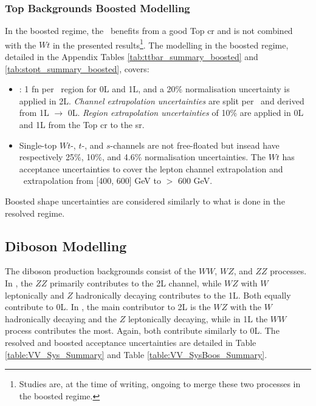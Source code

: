 \subsubsection{Top Backgrounds Boosted Modelling} 
In the boosted regime, the \ttb\ benefits from a good Top \gls{cr} and is not combined with the $Wt$ in the presented results\footnote{Studies are, at the time of writing, ongoing to merge these two processes in the boosted regime.}. The modelling in the boosted regime, detailed in the Appendix Tables \ref{tab:ttbar_summary_boosted} and \ref{tab:stopt_summary_boosted}, covers:
\begin{itemize}[leftmargin=*]
    \item \ttb: 1 \gls{fn} per \ptv\ region for 0L and 1L, and a 20\% normalisation uncertainty is applied in 2L. \textit{Channel extrapolation uncertainties} are split per \ptv\ and derived from 1L $\rightarrow$ 0L. \textit{Region extrapolation uncertainties} of 10\% are applied in 0L and 1L from the Top \gls{cr} to the \gls{sr}.
    \item Single-top $Wt$-, $t$-, and $s$-channels are not free-floated but insead have respectively 25\%, 10\%, and 4.6\% normalisation uncertainties. The $Wt$ has acceptance uncertainties to cover the lepton channel extrapolation and \ptv\ extrapolation from [400, 600] GeV to $>$ 600 GeV. 
\end{itemize}
Boosted shape uncertainties are considered similarly to what is done in the resolved regime.

\subsection{Diboson Modelling}
The diboson production backgrounds consist of the $WW$, $WZ$, and $ZZ$ processes. In \vhb, the $ZZ$ primarily contributes to the 2L channel, while $WZ$ with $W$ leptonically and $Z$ hadronically decaying contributes to the 1L. Both equally contribute to 0L. In \vhc, the main contributor to 2L is the $WZ$ with the $W$ hadronically decaying and the $Z$ leptonically decaying, while in 1L the $WW$ process contributes the most. Again, both contribute similarly to 0L. The resolved and boosted acceptance uncertainties are detailed in Table \ref{table:VV_Sys_Summary} and Table \ref{table:VV_SysBoos_Summary}. \\

